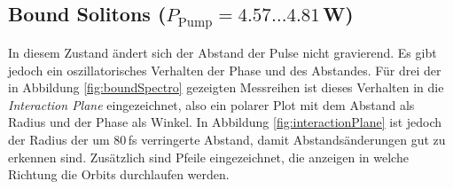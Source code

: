 \documentclass[bachelor,       %
               twoside,        %
               BCOR10mm,       %
               english,ngerman, %
               ]{GAUBM}
\begin{document}
\subsection{Bound Solitons ($P_\text{Pump}=4.57\dots4.81\,$W)}
In diesem Zustand ändert sich der Abstand der Pulse nicht gravierend.
Es gibt jedoch ein oszillatorisches Verhalten der Phase und des Abstandes.
Für drei der in Abbildung \ref{fig:boundSpectro} gezeigten Messreihen ist dieses Verhalten in die \textit{Interaction Plane} eingezeichnet, also ein polarer Plot mit dem Abstand als Radius und der Phase als Winkel.
In Abbildung \ref{fig:interactionPlane} ist jedoch der Radius der um 80\,fs verringerte Abstand, damit Abstandsänderungen gut zu erkennen sind.
Zusätzlich sind Pfeile eingezeichnet, die anzeigen in welche Richtung die Orbits durchlaufen werden.
\begin{figure}[!htb]
   \centering
   \hfill
   

\end{figure}
\end{document}
